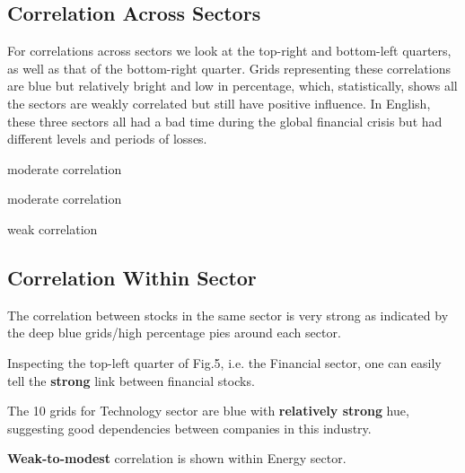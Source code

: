 \documentclass[11pt]{article}
\begin{document}
\subsection{Correlation Across Sectors}\vspace{-1em}
For correlations across sectors we look at the top-right and bottom-left quarters, as well as that of the bottom-right quarter. Grids representing these correlations are blue but relatively bright and low in percentage, which, statistically, shows all the sectors are weakly correlated but still have positive influence. In English, these three sectors all had a bad time during the global financial crisis but had different levels and periods of losses.
\begin{description}\vspace{-1em}
\item[Financial vs Technology] moderate correlation
\item[Technology vs Energy] moderate correlation
\item[Energy vs Financial] weak correlation
\end{description}

\subsection{Correlation Within Sector}\vspace{-1em}
The correlation between stocks in the same sector is very strong as indicated by the deep blue grids/high percentage pies around each sector. 
\begin{description}\vspace{-1em}
\item[Financial Sector] Inspecting the top-left quarter of Fig.5, i.e. the Financial sector, one can easily tell the \textbf{strong} link between financial stocks.
\item[Technology Sector] The 10 grids for Technology sector are blue with \textbf{relatively strong} hue, suggesting good dependencies between companies in this industry.
\item[Energy Sector] \textbf{Weak-to-modest} correlation is shown within Energy sector.
\end{description}
  
\end{document}
